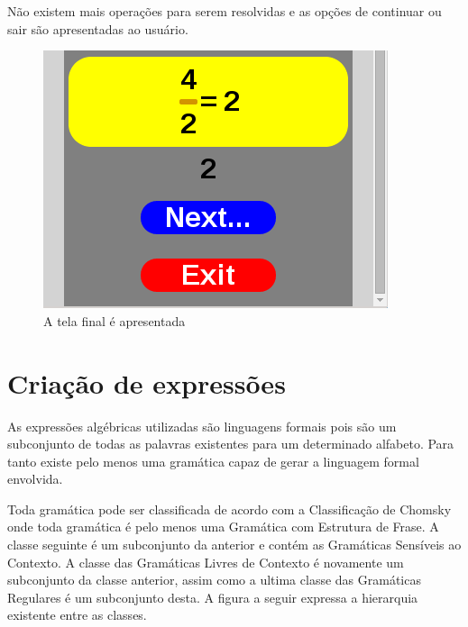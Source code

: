 	Não existem mais operações para serem resolvidas e as opções de continuar ou sair são apresentadas ao usuário.
	
\begin{figure}[H]
	\caption{\label{xp_11}A tela final é apresentada}
	\begin{center}
	    \includegraphics[scale=1]{xp_4_11.png}
	\end{center}
\end{figure}

\chapter{Criação de expressões}

As expressões algébricas utilizadas são linguagens formais pois são um subconjunto de todas as palavras existentes para um determinado alfabeto. Para tanto existe pelo menos uma gramática capaz de gerar a linguagem formal envolvida.

	Toda gramática pode ser classificada de acordo com a Classificação de Chomsky onde toda gramática é pelo menos uma Gramática com Estrutura de Frase. A classe seguinte é um subconjunto da anterior e contém as Gramáticas Sensíveis ao Contexto. A classe das Gramáticas Livres de Contexto é novamente um subconjunto da classe anterior, assim como a ultima classe das Gramáticas Regulares é um subconjunto desta. A figura a seguir expressa a hierarquia existente entre as classes.
	
